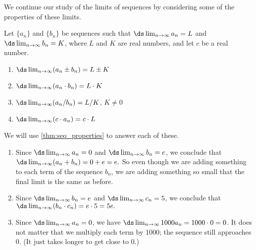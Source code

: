 We continue our study of the limits of sequences by considering some of the properties of these limits.

{Let $\{a_n\}$ and $\{b_n\}$ be sequences such that $\ds \lim_{n\to\infty} a_n = L$ and $\ds \lim_{n\to\infty} b_n = K$, where $L$ and $K$ are real numbers, and let $c$ be a real number.
\begin{multicols}{2}
\begin{enumerate}
\item		$\ds \lim_{n\to\infty} (a_n\pm b_n) = L\pm K$
\item		$\ds \lim_{n\to\infty} (a_n\cdot b_n) = L\cdot K$
\item		$\ds \lim_{n\to\infty} (a_n/b_n) = L/K$, $K\neq 0$
\item		$\ds \lim_{n\to\infty} (c\cdot a_n) = c\cdot L$
\end{enumerate}
\end{multicols}}

{We will use \autoref{thm:seq_properties} to answer each of these.
\begin{enumerate} 
\item		Since $\ds \lim_{n\to\infty} a_n = 0$ and $\ds \lim_{n\to\infty} b_n = e$, we conclude that $\ds \lim_{n\to\infty} (a_n+b_n) = 0+e = e.$ So even though we are adding something to each term of the sequence $b_n$, we are adding something so small that the final limit is the same as before.

\item		Since $\ds \lim_{n\to\infty} b_n = e$ and $\ds \lim_{n\to\infty} c_n = 5$, we conclude that $\ds \lim_{n\to\infty} (b_n\cdot c_n) = e\cdot 5 = 5e.$

\item		Since $\ds \lim_{n\to\infty} a_n = 0$, we have $\ds \lim_{n\to\infty} 1000a_n =1000\cdot 0 = 0$. It does not matter that we multiply each term by 1000; the sequence still approaches 0. (It just takes longer to get close to 0.)\eoehere
\end{enumerate}}

